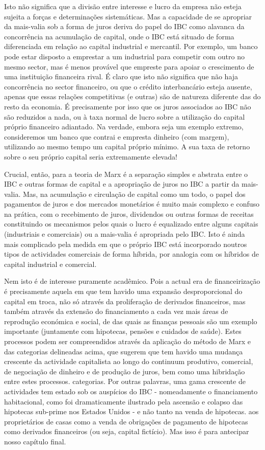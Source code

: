 Isto não significa que a divisão entre interesse e lucro da empresa não esteja sujeita a forças e determinações sistemáticas. Mas a capacidade de se apropriar da mais-valia sob a forma de juros deriva do papel do IBC como alavanca da concorrência na acumulação de capital, onde o IBC está situado de forma diferenciada em relação ao capital industrial e mercantil. Por exemplo, um banco pode estar disposto a emprestar a um industrial para competir com outro no mesmo sector, mas é menos provável que empreste para apoiar o crescimento de uma instituição financeira rival. É claro que isto não significa que não haja concorrência no sector financeiro, ou que o crédito interbancário esteja ausente, apenas que essas relações competitivas (e outras) são de natureza diferente das do resto da economia. É precisamente por isso que os juros associados ao IBC não são reduzidos a nada, ou à taxa normal de lucro sobre a utilização do capital próprio financeiro adiantado. Na verdade, embora seja um exemplo extremo, consideremos um banco que contrai e empresta dinheiro (com margem), utilizando ao mesmo tempo um capital próprio mínimo. A sua taxa de retorno sobre o seu próprio capital seria extremamente elevada!
 \par 
Crucial, então, para a teoria de Marx é a separação simples e abstrata entre o IBC e outras formas de capital e a apropriação de juros no IBC a partir da mais-valia. Mas, na acumulação e circulação de capital como um todo, o papel dos pagamentos de juros e dos mercados monetários é muito mais complexo e confuso na prática, com o recebimento de juros, dividendos ou outras formas de receitas constituindo os mecanismos pelos quais o lucro é equalizado entre alguns capitais (industriais e comerciais) ou a mais-valia é apropriada pelo IBC. Isto é ainda mais complicado pela medida em que o próprio IBC está incorporado noutros tipos de actividades comerciais de forma híbrida, por analogia com os híbridos de capital industrial e comercial.
 \par 
Nem isto é de interesse puramente acadêmico. Pois a actual era de financeirização é precisamente aquela em que tem havido uma expansão desproporcional do capital em troca, não só através da proliferação de derivados financeiros, mas também através da extensão do financiamento a cada vez mais áreas de reprodução económica e social, de das quais as finanças pessoais são um exemplo importante (juntamente com hipotecas, pensões e cuidados de saúde). Estes processos podem ser compreendidos através da aplicação do método de Marx e das categorias delineadas acima, que sugerem que tem havido uma mudança crescente da actividade capitalista ao longo do continuum produtivo, comercial, de negociação de dinheiro e de produção de juros, bem como uma hibridação entre estes processos. categorias. Por outras palavras, uma gama crescente de actividades tem estado sob os auspícios do IBC - nomeadamente o financiamento habitacional, como foi dramaticamente ilustrado pela ascensão e colapso das hipotecas sub-prime nos Estados Unidos - e não tanto na venda de hipotecas. aos proprietários de casas como a venda de obrigações de pagamento de hipotecas como derivados financeiros (ou seja, capital fictício). Mas isso é para antecipar nosso capítulo final.
